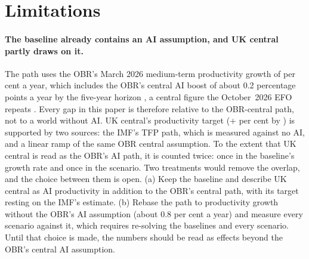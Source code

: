 \section{Limitations}
\label{sec:limitations}

\paragraph{The baseline already contains an AI assumption, and UK central partly draws on it.} The path uses the OBR's March 2026 medium-term productivity growth of \genGyAnnualPct{} per cent a year, which includes the OBR's central AI boost of about 0.2 percentage points a year by the five-year horizon \citep{obr2025bp9}, a central figure the October~2026 EFO repeats \citep[para~1.27]{obr2026efooctrep}. Every gap in this paper is therefore relative to the OBR-central path, not to a world without AI. UK central's productivity target (+\genUkCentralTfpPct{} per cent by \genHeadYear{}) is supported by two sources: the IMF's TFP path, which is measured against no AI, and a linear ramp of the same OBR central assumption. To the extent that UK central is read as the OBR's AI path, it is counted twice: once in the baseline's growth rate and once in the scenario. Two treatments would remove the overlap, and the choice between them is open. (a) Keep the baseline and describe UK central as AI productivity in addition to the OBR's central path, with its target resting on the IMF's estimate. (b) Rebase the path to productivity growth without the OBR's AI assumption (about 0.8 per cent a year) and measure every scenario against it, which requires re-solving the baselines and every scenario. Until that choice is made, the numbers should be read as effects beyond the OBR's central AI assumption.

